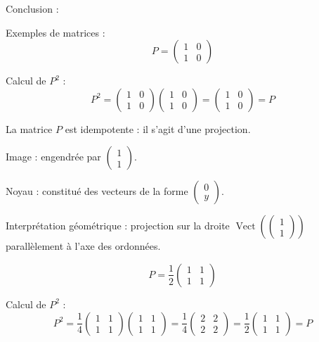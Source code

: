 \documentclass[10pt,a4paper]{article}
\begin{document}
Conclusion : 

\q Exemples de matrices :
\[
P =
\begin{pmatrix}
1 & 0\\
1 & 0
\end{pmatrix}
\]

Calcul de $P^2$ :
\[
P^2 =
\begin{pmatrix}
1 & 0\\
1 & 0
\end{pmatrix}
\begin{pmatrix}
1 & 0\\
1 & 0
\end{pmatrix}
=
\begin{pmatrix}
1 & 0\\
1 & 0
\end{pmatrix}
= P
\]

La matrice $P$ est idempotente : il s'agit d'une projection.

Image : engendrée par $\begin{pmatrix}1\\1\end{pmatrix}$.

Noyau : constitué des vecteurs de la forme $\begin{pmatrix}0\\y\end{pmatrix}$.

Interprétation géométrique : projection sur la droite $\operatorname{Vect}\left(\begin{pmatrix}1\\1\end{pmatrix}\right)$ parallèlement à l'axe des ordonnées.


\[
P = \frac{1}{2}
\begin{pmatrix}
1 & 1\\
1 & 1
\end{pmatrix}
\]

Calcul de $P^2$ :
\[
P^2 = \frac{1}{4}
\begin{pmatrix}
1 & 1\\
1 & 1
\end{pmatrix}
\begin{pmatrix}
1 & 1\\
1 & 1
\end{pmatrix}
= \frac{1}{4}
\begin{pmatrix}
2 & 2\\
2 & 2
\end{pmatrix}
=
\frac{1}{2}
\begin{pmatrix}
1 & 1\\
1 & 1
\end{pmatrix}
= P
\]
\end{document}
